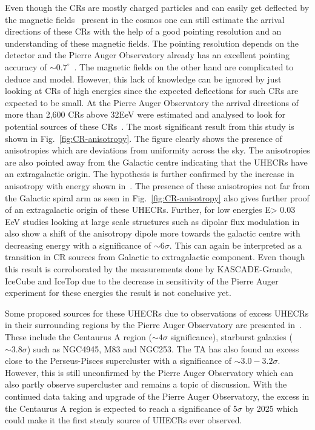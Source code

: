Even though the \glspl{CR} are mostly charged particles and can easily get deflected by the magnetic fields~\cite{Ar_mburo_Garc_a_2021} present in the cosmos one can still estimate the arrival directions of these \glspl{CR} with the help of a good pointing resolution and an understanding of these magnetic fields. The pointing resolution depends on the detector and the Pierre Auger Observatory already has an excellent pointing accuracy of $\sim 0.7^{\circ}$~\cite{BONIFAZI200920}. The magnetic fields on the other hand are complicated to deduce and model. However, this lack of knowledge can be ignored by just looking at \glspl{CR} of high energies since the expected deflections for such \glspl{CR} are expected to be small. At the Pierre Auger Observatory the arrival directions of more than 2,600 \glspl{CR} above 32EeV were estimated and analysed to look for potential sources of these \glspl{CR}~\cite{Abreu_2022}. The most significant result from this study is shown in Fig.~\ref{fig:CR-anisotropy}. The figure clearly shows the presence of anisotropies which are deviations from uniformity across the sky. The anisotropies are also pointed away from the Galactic centre indicating that the \glspl{UHECR} have an extragalactic origin. The hypothesis is further confirmed by the increase in anisotropy with energy shown in~\cite{Abreu_2022}. The presence of these anisotropies not far from the Galactic spiral arm as seen in Fig.~\ref{fig:CR-anisotropy} also gives further proof of an extragalactic origin of these \glspl{UHECR}. Further, for low energies E> 0.03 EeV studies looking at large scale structures such as dipolar flux modulation in~\cite{Aab_2020_dipole_modulation} also show a shift of the anisotropy dipole more towards the galactic centre with decreasing energy with a significance of $\sim 6 \sigma$. This can again be interpreted as a transition in CR sources from Galactic to extragalactic component. Even though this result is corroborated by the measurements done by KASCADE-Grande, IceCube and IceTop due to the decrease in sensitivity of the Pierre Auger experiment for these energies the result is not conclusive yet.

Some proposed sources for these \glspl{UHECR} due to observations of excess \glspl{UHECR} in their surrounding regions by the Pierre Auger Observatory are presented in~\cite{TelescopeArray:2021gxg}. These include the Centaurus A region ($\sim 4\sigma$ significance), starburst galaxies ($\sim 3.8\sigma$) such as NGC4945, M83 and NGC253. The \gls{TA} has also found an excess close to the Perseus-Pisces supercluster with a significance of $\sim3.0-3.2\sigma$. However, this is still unconfirmed by the Pierre Auger Observatory which can also partly observe supercluster and remains a topic of discussion. With the continued data taking and upgrade of the Pierre Auger Observatory, the excess in the Centaurus A region is expected to reach a significance of 5$\sigma$  by 2025 which could make it the first steady source of \glspl{UHECR} ever observed. 
 

